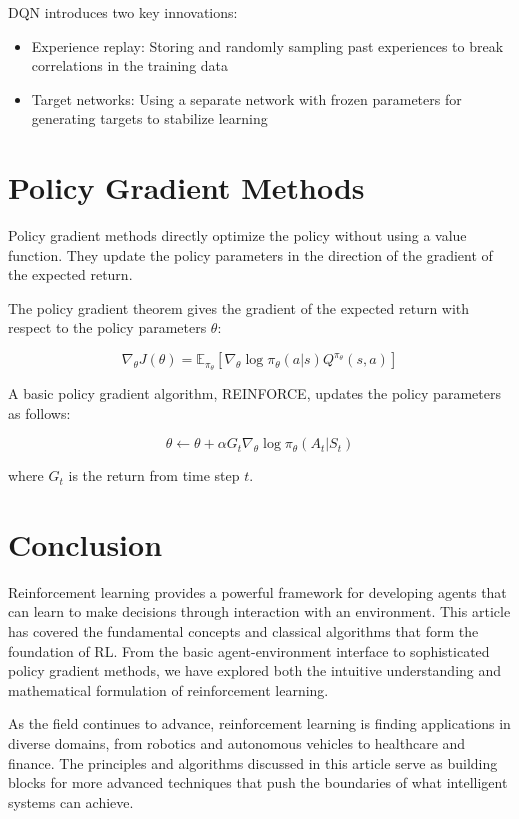 \documentclass{article}
\begin{document}
DQN introduces two key innovations:
\begin{itemize}
    \item Experience replay: Storing and randomly sampling past experiences to break correlations in the training data
    \item Target networks: Using a separate network with frozen parameters for generating targets to stabilize learning
\end{itemize}

\section{Policy Gradient Methods}

Policy gradient methods directly optimize the policy without using a value function. They update the policy parameters in the direction of the gradient of the expected return.

The policy gradient theorem gives the gradient of the expected return with respect to the policy parameters $\theta$:

\begin{equation}
\nabla_\theta J(\theta) = \mathbb{E}_{\pi_\theta} [\nabla_\theta \log \pi_\theta(a|s) Q^{\pi_\theta}(s, a)]
\end{equation}

A basic policy gradient algorithm, REINFORCE, updates the policy parameters as follows:

\begin{equation}
\theta \leftarrow \theta + \alpha G_t \nabla_\theta \log \pi_\theta(A_t|S_t)
\end{equation}

where $G_t$ is the return from time step $t$.

\section{Conclusion}

Reinforcement learning provides a powerful framework for developing agents that can learn to make decisions through interaction with an environment. This article has covered the fundamental concepts and classical algorithms that form the foundation of RL. From the basic agent-environment interface to sophisticated policy gradient methods, we have explored both the intuitive understanding and mathematical formulation of reinforcement learning.

As the field continues to advance, reinforcement learning is finding applications in diverse domains, from robotics and autonomous vehicles to healthcare and finance. The principles and algorithms discussed in this article serve as building blocks for more advanced techniques that push the boundaries of what intelligent systems can achieve.
\end{document}
